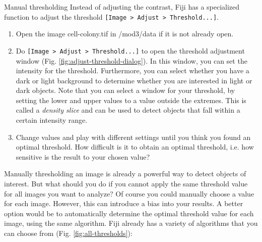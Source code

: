 \begin{taskbox}{Manual thresholding}
Instead of adjusting the contrast, Fiji has a specialized function to adjust the threshold \texttt{[Image > Adjust > Threshold...]}.

\begin{enumerate}
	\item Open the image cell-colony.tif in /mod3/data if it is not already open. 
	\item Do \texttt{[Image > Adjust > Threshold...]} to open the threshold adjustment window (Fig. \ref{fig:adjust-threshold-dialog}). In this window, you can set the intensity for the threshold. Furthermore, you can select whether you have a dark or light background to determine whether you are interested in light or dark objects. Note that you can select a window for your threshold, by setting the lower and upper values to a value outside the extremes. This is called a \emph{density slice} and can be used to detect objects that fall within a certain intensity range.
	
	\begin{minipage}[t]{\linewidth}
		\begin{center}
		\medskip
		\label{fig:adjust-threshold-dialog}
		\end{center}
	\end{minipage}
	
	\item Change values and play with different settings until you think you found an optimal threshold. How difficult is it to obtain an optimal threshold, i.e. how sensitive is the result to your chosen value?
	\end{enumerate}
\end{taskbox}

Manually thresholding an image is already a powerful way to detect objects of interest. But what should you do if you cannot apply the same threshold value for all images you want to analyze? Of course you could manually choose a value for each image. However, this can introduce a bias into your results. A better option would be to automatically determine the optimal threshold value for each image, using the same algorithm. Fiji already has a variety of algorithms that you can choose from (Fig. \ref{fig:all-thresholds}):

